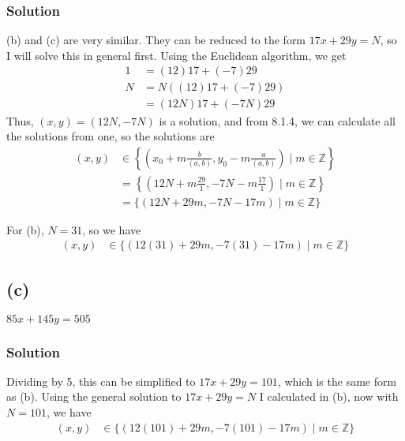 \documentclass[fleqn]{article}
\begin{document}
            \subsubsection{Solution}
            (b) and (c) are very similar.  They can be reduced to the form $17x + 29y = N$, so I will solve this in general first.  Using the Euclidean algorithm, we get
            \begin{align}
                1 &= (12) 17 + (-7) 29 \\
                N &= N ((12) 17 + (-7) 29) \\
                    &= (12N) 17 + (-7N) 29
            \end{align}
            Thus, $(x, y) = (12N, -7N)$ is a solution, and from 8.1.4, we can calculate all the solutions from one, so the solutions are
            \begin{align}
                (x, y) &\in \left\{\left(x_0 + m \frac{b}{(a, b)}, y_0 - m \frac{a}{(a, b)}\right)\mid m \in \mathbb{Z}\right\} \\
                    &= \left\{\left(12N + m \frac{29}{1}, -7N - m \frac{17}{1}\right)\mid m \in \mathbb{Z}\right\} \\
                    &= \{(12N + 29m, -7N - 17m)\mid m \in \mathbb{Z}\}
            \end{align}
            
            For (b), $N = 31$, so we have
            \begin{align}
                (x, y) &\in \{(12(31) + 29m, -7(31) - 17m)\mid m \in \mathbb{Z}\}
            \end{align}
        
        \subsection{(c)}
        $85x + 145y = 505$
        
            \subsubsection{Solution}
            Dividing by 5, this can be simplified to $17x + 29y = 101$, which is the same form as (b).  Using the general solution to $17x + 29y = N$ I calculated in (b), now with $N = 101$, we have
            \begin{align}
                (x, y) &\in \{(12(101) + 29m, -7(101) - 17m)\mid m \in \mathbb{Z}\}
            \end{align}
    
\end{document}
